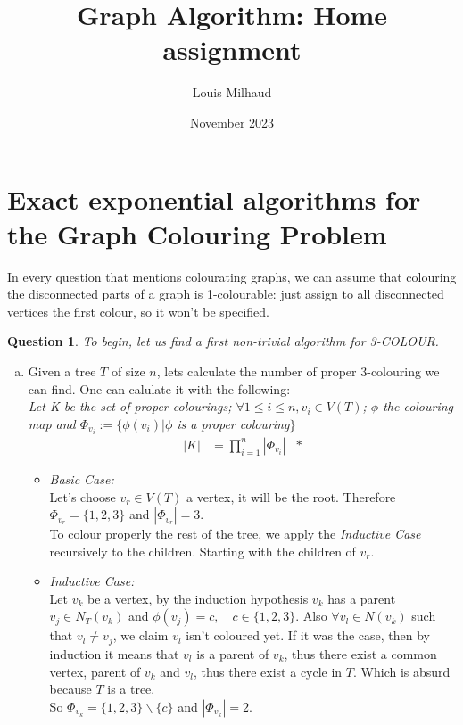 \documentclass{article}
\title{Graph Algorithm: Home assignment}
\author{Louis Milhaud}
\date{November 2023}
\newtheorem{Question}[theorem]{Question}
\begin{document}
\maketitle

\section{Exact exponential algorithms for the Graph Colouring Problem}
In every question that mentions colourating graphs, we can assume that colouring the disconnected parts of a graph is 1-colourable: just assign to all disconnected vertices the first colour, so it won't be specified. 
\begin{Question}
    To begin, let us find a first non-trivial algorithm for 3-COLOUR.
\end{Question}
\begin{enumerate}[(a)]
    \item Given a tree $T$ of size $n$, lets calculate the number of proper 3-colouring we can find. One can calulate it with the following:\\
    \emph{Let K be the set of proper colourings; $\forall 1 \leq i \leq n, v_i \in V(T)$; $\phi$ the colouring map and $\Phi_{v_i} := \{\phi(v_i) | \phi$ is a proper colouring$\}$}
    \begin{align*}
        |K|&=\prod_{i=1}^{n}|\Phi_{v_i}| &*
    \end{align*}
    \begin{itemize}
        \item \emph{Basic Case:}\\
        Let's choose $v_r \in V(T)$ a vertex, it will be the root. Therefore $\Phi_{v_r}=\{1, 2, 3\}$ and $|\Phi_{v_r}|=3$.\\
        To colour properly the rest of the tree, we apply the \emph{Inductive Case} recursively to the children. Starting with the children of $v_r$.
        \item \emph{Inductive Case:}\\
        Let $v_k$ be a vertex, by the induction hypothesis $v_k$ has a parent $v_j \in N_T(v_k)$ and $\phi(v_j)=c, \quad c \in \{1, 2, 3\}$. Also $\forall v_l \in N(v_k)$ such that $v_l \neq v_j$, we claim $v_l$ isn't coloured yet. If it was the case, then by induction it means that $v_l$ is a parent of $v_k$, thus there exist a common vertex, parent of $v_k$ and $v_l$, thus there exist a cycle in $T$. Which is absurd because $T$ is a tree.\\
        So $\Phi_{v_k}=\{1, 2, 3\}\backslash \{c\}$ and $|\Phi_{v_k}|=2$.

\end{itemize}
\end{enumerate}
\end{document}
